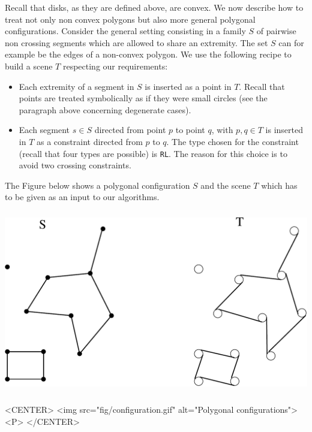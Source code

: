 Recall that disks, as they are defined above, are convex. We now describe
how to treat not only non convex polygons but also more general polygonal
configurations. Consider the general setting consisting in a family $S$ of
pairwise non crossing segments which are allowed to share an extremity. The
set $S$ can for example be the edges of a non-convex polygon.  We use the
following recipe to build a scene $T$ respecting our requirements:
\begin{itemize}
    \item Each extremity of a segment in $S$ is inserted as a point in $T$.
    Recall that points are treated symbolically as if they were small
    circles (see the paragraph above concerning degenerate cases).
    \item Each segment $s \in S$ directed from point $p$ to point $q$, with
    $p,q \in T$ is inserted in $T$ as a constraint directed from $p$ to
    $q$. The type chosen for the constraint (recall that four types are
    possible) is \texttt{RL}. The reason for this choice is to avoid two
    crossing constraints.
\end{itemize}

The Figure below shows a polygonal configuration $S$ and the scene $T$ which
has to be given as an input to our algorithms. 

\begin{ccTexOnly}
    \begin{center}
        \includegraphics[height=8cm]{Visibility_complex/fig/configuration}%
    \end{center}
\end{ccTexOnly}

\begin{ccHtmlOnly}
    <CENTER>
        <img src="fig/configuration.gif" alt="Polygonal configurations"><P>
    </CENTER>
\end{ccHtmlOnly}

